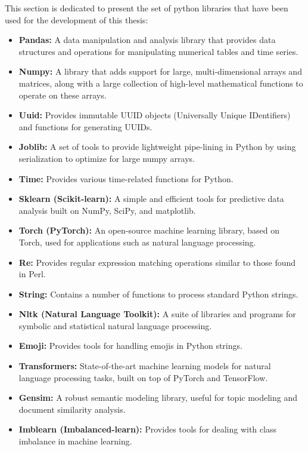 
\color{red}
This section is dedicated to present the set of python libraries that have been used for the development of this thesis:

\begin{itemize}
    \item \textbf{Pandas:} A data manipulation and analysis library that provides data structures and operations for manipulating numerical tables and time series.
    \item \textbf{Numpy:} A library that adds support for large, multi-dimensional arrays and matrices, along with a large collection of high-level mathematical functions to operate on these arrays.
    \item \textbf{Uuid:} Provides immutable UUID objects (Universally Unique IDentifiers) and functions for generating UUIDs.
    \item \textbf{Joblib:} A set of tools to provide lightweight pipe-lining in Python by using serialization to optimize for large numpy arrays.
    \item \textbf{Time:} Provides various time-related functions for Python.
    \item \textbf{Sklearn (Scikit-learn):} A simple and efficient tools for predictive data analysis built on NumPy, SciPy, and matplotlib.
    \item \textbf{Torch (PyTorch):} An open-source machine learning library, based on Torch, used for applications such as natural language processing.
    \item \textbf{Re:} Provides regular expression matching operations similar to those found in Perl.
    \item \textbf{String:} Contains a number of functions to process standard Python strings.
    \item \textbf{Nltk (Natural Language Toolkit):} A suite of libraries and programs for symbolic and statistical natural language processing.
    \item \textbf{Emoji:} Provides tools for handling emojis in Python strings.
    \item \textbf{Transformers:} State-of-the-art machine learning models for natural language processing tasks, built on top of PyTorch and TensorFlow.
    \item \textbf{Gensim:} A robust semantic modeling library, useful for topic modeling and document similarity analysis.
    \item \textbf{Imblearn (Imbalanced-learn):} Provides tools for dealing with class imbalance in machine learning.

\end{itemize}
